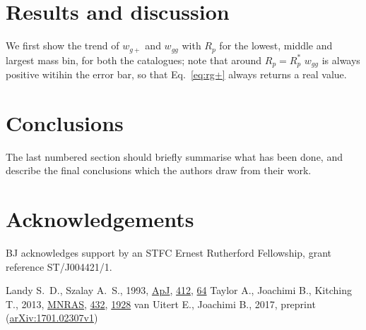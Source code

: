 \documentclass[a4paper,fleqn,usenatbib]{mnras}
\begin{document}
\section{Results and discussion}
We first show the trend of $w_{g+}$ and $w_{gg}$ with $R_p$ for the lowest, middle and largest mass bin, for both the catalogues; note that around $R_p = R_p^*$ $w_{gg}$ is always positive witihin the error bar, so that Eq.~\ref{eq:rg+} always returns a real value.


\label{sec:resanddiscuss}

\section{Conclusions}

The last numbered section should briefly summarise what has been done, and describe
the final conclusions which the authors draw from their work.

\section*{Acknowledgements}

BJ acknowledges support by an STFC Ernest Rutherford Fellowship, grant reference ST/J004421/1.




%


\begin{thebibliography}{99}
Landy S.~D., Szalay A.~S., 1993, \href{http://adsabs.harvard.edu/doi/10.1086/172900}{ApJ}, \href{http://adsabs.harvard.edu/doi/10.1086/172900}{412}, \href{http://adsabs.harvard.edu/doi/10.1086/172900}{64}
Taylor A., Joachimi B., Kitching T., 2013,  \href{https://academic.oup.com/mnras/article-lookup/doi/10.1093/mnras/stt270}{MNRAS}, \href{http://adsabs.harvard.edu/abs/2013MNRAS.432.1928}{432}, \href{http://adsabs.harvard.edu/abs/2013MNRAS.432.1928}{1928}
van Uitert E., Joachimi B., 2017, preprint (\href{https://arxiv.org/abs/1701.02307}{arXiv:1701.02307v1}) 

\end{thebibliography}
\end{document}

